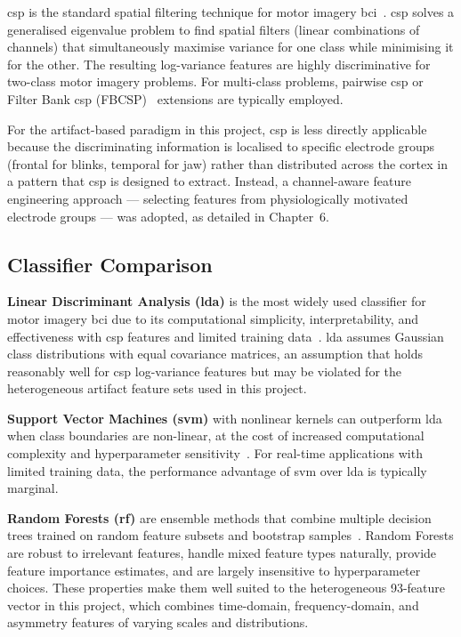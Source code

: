 \acrfull{csp} is the standard spatial filtering technique for
motor imagery \acrshort{bci}~\cite{blankertz2008csp}. \acrshort{csp}
solves a generalised eigenvalue problem to find spatial filters
(linear combinations of channels) that simultaneously maximise
variance for one class while minimising it for the other. The
resulting log-variance features are highly discriminative for
two-class motor imagery problems. For multi-class problems,
pairwise \acrshort{csp} or Filter Bank \acrshort{csp}
(FBCSP)~\cite{ang2012fbcsp} extensions are typically employed.

For the artifact-based paradigm in this project, \acrshort{csp}
is less directly applicable because the discriminating information
is localised to specific electrode groups (frontal for blinks,
temporal for jaw) rather than distributed across the cortex in
a pattern that \acrshort{csp} is designed to extract. Instead, a
channel-aware feature engineering approach — selecting features
from physiologically motivated electrode groups — was adopted,
as detailed in Chapter~6.

\subsection{Classifier Comparison}

\textbf{Linear Discriminant Analysis (\acrshort{lda})} is the most
widely used classifier for motor imagery \acrshort{bci} due to its
computational simplicity, interpretability, and effectiveness with
\acrshort{csp} features and limited training
data~\cite{lotte2007review}. \acrshort{lda} assumes Gaussian class
distributions with equal covariance matrices, an assumption that
holds reasonably well for \acrshort{csp} log-variance features but
may be violated for the heterogeneous artifact feature sets used
in this project.

\textbf{Support Vector Machines (\acrshort{svm})} with nonlinear
kernels can outperform \acrshort{lda} when class boundaries are
non-linear, at the cost of increased computational complexity and
hyperparameter sensitivity~\cite{lal2004svm}. For real-time
applications with limited training data, the performance advantage
of \acrshort{svm} over \acrshort{lda} is typically marginal.

\textbf{Random Forests (\acrshort{rf})} are ensemble methods that
combine multiple decision trees trained on random feature subsets
and bootstrap samples~\cite{breiman2001rf}. Random Forests are
robust to irrelevant features, handle mixed feature types naturally,
provide feature importance estimates, and are largely insensitive
to hyperparameter choices. These properties make them well suited
to the heterogeneous 93-feature vector in this project, which
combines time-domain, frequency-domain, and asymmetry features of
varying scales and distributions.

